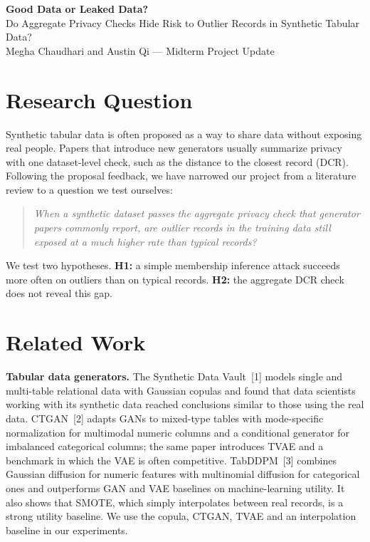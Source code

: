 \documentclass[11pt]{article}
\begin{document}
\begin{center}
{\large\bfseries Good Data or Leaked Data?}\\[2pt]
Do Aggregate Privacy Checks Hide Risk to Outlier Records in Synthetic Tabular Data?\\[4pt]
Megha Chaudhari and Austin Qi --- Midterm Project Update
\end{center}

\section*{Research Question}

Synthetic tabular data is often proposed as a way to share data without exposing real people. Papers that introduce new generators usually summarize privacy with one dataset-level check, such as the distance to the closest record (DCR). Following the proposal feedback, we have narrowed our project from a literature review to a question we test ourselves:

\begin{quote}
\emph{When a synthetic dataset passes the aggregate privacy check that generator papers commonly report, are outlier records in the training data still exposed at a much higher rate than typical records?}
\end{quote}

We test two hypotheses. \textbf{H1:} a simple membership inference attack succeeds more often on outliers than on typical records. \textbf{H2:} the aggregate DCR check does not reveal this gap.

\section*{Related Work}

\textbf{Tabular data generators.} The Synthetic Data Vault~[1] models single and multi-table relational data with Gaussian copulas and found that data scientists working with its synthetic data reached conclusions similar to those using the real data. CTGAN~[2] adapts GANs to mixed-type tables with mode-specific normalization for multimodal numeric columns and a conditional generator for imbalanced categorical columns; the same paper introduces TVAE and a benchmark in which the VAE is often competitive. TabDDPM~[3] combines Gaussian diffusion for numeric features with multinomial diffusion for categorical ones and outperforms GAN and VAE baselines on machine-learning utility. It also shows that SMOTE, which simply interpolates between real records, is a strong utility baseline. We use the copula, CTGAN, TVAE and an interpolation baseline in our experiments.
\end{document}

